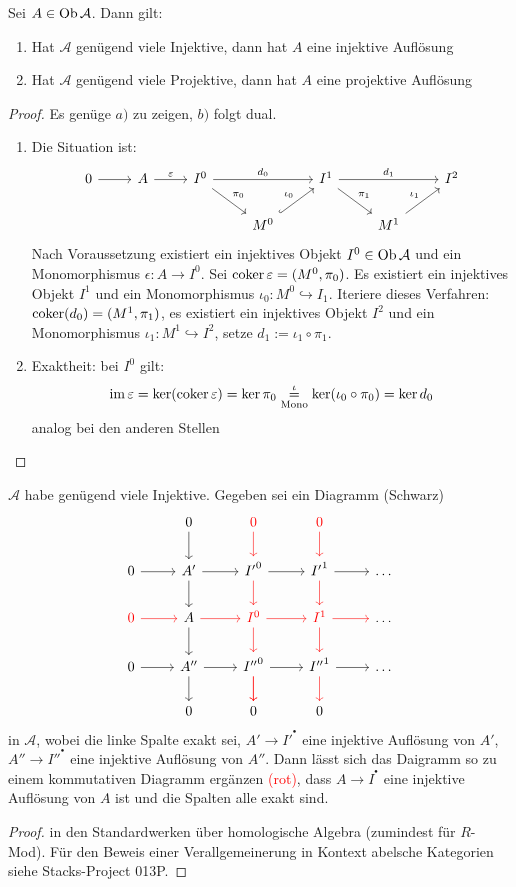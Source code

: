\begin{bem}\label{7.8}
	Sei $A\in \text{Ob}\,\mathcal{A}$. Dann gilt:
	\begin{enumerate}[label = \alph*)]
		\item Hat $\mathcal{A}$ genügend viele Injektive, dann hat $A$ eine injektive Auflösung
		\item Hat $\mathcal{A}$ genügend viele Projektive, dann hat $A$ eine projektive Auflösung
	\end{enumerate}
\end{bem}
\begin{proof}
	Es genüge $a)$ zu zeigen, $b)$ folgt dual.
	\begin{enumerate}
		\item Die Situation ist:
		$$\begin{tikzcd}
		0 \arrow{r} & A \arrow{r}{\epsilon}& I^0 \arrow{dr}{\pi_0} \arrow{rr}{d_0} & & I^1\arrow{dr}{\pi_1} \arrow{rr}{d_1} & & I^2 \\
		& & & M^0 \arrow[hook]{ur}{\iota_0} & & M^1 \arrow{ur}{\iota_1}  &		
		\end{tikzcd}$$
		Nach Voraussetzung existiert ein injektives Objekt $I^0 \in \text{Ob}\,\mathcal{A}$ und ein Monomorphismus $\epsilon:A \to I^0$. Sei $\operatorname{coker} \varepsilon= (M^0, \pi_0)$. Es existiert ein injektives Objekt $I^1$ und ein Monomorphismus $\iota_0:M^0 \hookrightarrow I_1$. Iteriere dieses Verfahren: $\operatorname{coker}(d_0) = (M^1, \pi_1)$, es existiert ein injektives Objekt $I^2$ und ein Monomorphismus $\iota_1:M^1\hookrightarrow I^2$, setze $d_1:= \iota_1 \circ \pi_1$.
		\item Exaktheit: bei $I^0$ gilt:
		$$\operatorname{im} \varepsilon = \ker (\operatorname{coker} \varepsilon) = \ker \pi_0 \underset{\text{Mono}}{\overset{\iota}{=}} \ker (\iota_0 \circ \pi_0) = \ker d_0$$
		analog bei den anderen Stellen
	\end{enumerate}
\end{proof}
\begin{sa}[Hufeisenlemma]\label{7.9}
	$\mathcal{A}$ habe genügend viele Injektive. Gegeben sei ein Diagramm (Schwarz)
	$$\begin{tikzcd}
	& 0\arrow{d} &\textcolor{red}{0} \arrow[red]{d} & \textcolor{red}{0} \arrow[red]{d} & \\
	0 \arrow{r}& A'\arrow{d} \arrow{r} & {I'}^0\arrow[red]{d} \arrow{r} & {I'}^1 \arrow[red]{d} \arrow{r} & \ldots\\
	\textcolor{red}{0} \arrow[red]{r}& A\arrow{d} \arrow[red]{r}& \textcolor{red}{I^0} \arrow[red]{d}\arrow[red]{r} &\arrow[red]{d} \textcolor{red}{I^1} \arrow[red]{r} & \ldots\\
	0 \arrow{r} & A''\arrow{d} \arrow{r} & {I''}^0\arrow[red]{d} \arrow[red]{d} \arrow{r} & {I''}^1 \arrow[red]{d} \arrow{r} & \ldots\\
	& 0 & 0 & 0
	\end{tikzcd}$$
	in $\mathcal{A}$, wobei die linke Spalte exakt sei, $A'\to I'^{^\bullet}$ eine injektive Auflösung von $A'$, $A''\to {I''}^{^\bullet}$ eine injektive Auflösung von $A''$. Dann lässt sich das Daigramm so zu einem kommutativen Diagramm ergänzen \textcolor{red}{(rot)}, dass $A\to I^{^\bullet}$ eine injektive Auflösung von $A$ ist und die Spalten alle exakt sind.
\end{sa}
\begin{proof}
	in den Standardwerken über homologische Algebra (zumindest für $R$-Mod). Für den Beweis einer Verallgemeinerung in Kontext abelsche Kategorien siehe Stacks-Project 013P.
\end{proof}